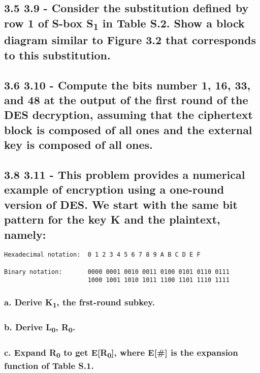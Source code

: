 \documentclass[
    article,            %
    11pt,               %
    oneside,            %
    a4paper,            %
    english,            %
    brazil,             %
    sumario=tradicional,
    ]{abntex2}
\begin{document}
\subsection*{\textbf{3.5 3.9 - Consider the substitution defined by row 1 of S-box S\textsubscript{1} in Table S.2. Show a block diagram similar to Figure 3.2 that corresponds to this substitution.}}


\subsection*{\textbf{3.6 3.10 - Compute the bits number 1, 16, 33, and 48 at the output of the first round of the DES decryption, assuming that the ciphertext block is composed of all ones and the external key is composed of all ones.}}


\subsection*{\textbf{3.8 3.11 - This problem provides a numerical example of encryption using a one-round version of DES. We start with the same bit pattern for the key K and the plaintext, namely:}}
\begin{Verbatim}
Hexadecimal notation:  0 1 2 3 4 5 6 7 8 9 A B C D E F

Binary notation:       0000 0001 0010 0011 0100 0101 0110 0111
                       1000 1001 1010 1011 1100 1101 1110 1111
\end{Verbatim}
\subsubsection*{a. Derive K\textsubscript{1}, the frst-round subkey.}
\subsubsection*{b. Derive L\textsubscript{0}, R\textsubscript{0}.}
\subsubsection*{c. Expand R\textsubscript{0} to get E[R\textsubscript{0}], where E[\#] is the expansion function of Table S.1.}
\end{document}

